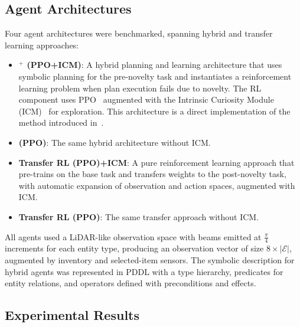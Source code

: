 \subsection{Agent Architectures}
\label{sec:ng_agents}

Four agent architectures were benchmarked, spanning hybrid and transfer learning approaches:
\begin{itemize}[leftmargin=*]
    \item \textbf{\RAPidLearn{}$^+$ (PPO+ICM)}: A hybrid planning and learning architecture that uses symbolic planning for the pre-novelty task and instantiates a reinforcement learning problem when plan execution fails due to novelty. The RL component uses PPO~\citep{schulman2017proximal} augmented with the Intrinsic Curiosity Module (ICM)~\citep{pathak2017curiosity} for exploration. This architecture is a direct implementation of the method introduced in~\citet{goel2022rapidlearn}.
    \item \textbf{\RAPidLearn{} (PPO)}: The same hybrid architecture without ICM.
    \item \textbf{Transfer RL (PPO)+ICM}: A pure reinforcement learning approach that pre-trains on the base task and transfers weights to the post-novelty task, with automatic expansion of observation and action spaces, augmented with ICM.
    \item \textbf{Transfer RL (PPO)}: The same transfer approach without ICM.
\end{itemize}

All agents used a LiDAR-like observation space with beams emitted at $\frac{\pi}{4}$ increments for each entity type, producing an observation vector of size $8 \times |\mathcal{E}|$, augmented by inventory and selected-item sensors. The symbolic description for hybrid agents was represented in PDDL with a type hierarchy, predicates for entity relations, and operators defined with preconditions and effects.


\subsection{Experimental Results}
\label{sec:ng_results}

